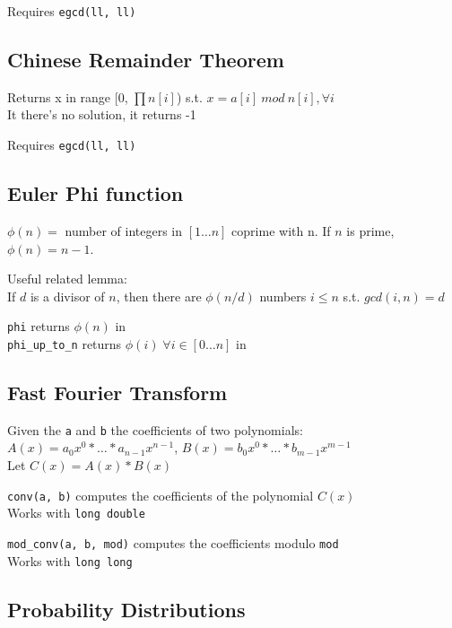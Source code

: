 Requires \verb|egcd(ll, ll)|


\subsection{Chinese Remainder Theorem}
Returns x in range [0, $\prod{n[i]}$) s.t.
$x = a[i] \: mod \: n[i], \forall i$ \\
It there's no solution, it returns -1

Requires \verb|egcd(ll, ll)|


\subsection{Euler Phi function}
$\phi(n) = $ number of integers in $[1\ldots n]$ coprime with n. If $n$ is prime, $\phi(n)=n-1$.

Useful related lemma: \\
If $d$ is a divisor of $n$, then there are $\phi(n / d)$ numbers $i \leq n$ s.t. $gcd(i, n) = d$

\verb|phi| returns $\phi(n)$ in  \\
\verb|phi_up_to_n| returns $\phi(i) \; \forall i \in [0 \ldots n]$ in 



\subsection{Fast Fourier Transform}

Given the \verb|a| and \verb|b| the coefficients of two polynomials: \\
$A(x) = a_0 x^0 * \ldots * a_{n-1} x^{n-1}$, $B(x) = b_0 x^0 * \ldots * b_{m-1} x^{m-1}$ \\
Let $C(x) = A(x) * B(x)$

\verb|conv(a, b)| computes the coefficients of the polynomial $C(x)$ \\
Works with \verb|long double|

\verb|mod_conv(a, b, mod)| computes the coefficients modulo \verb|mod| \\
Works with \verb|long long|



\subsection{Probability Distributions}

